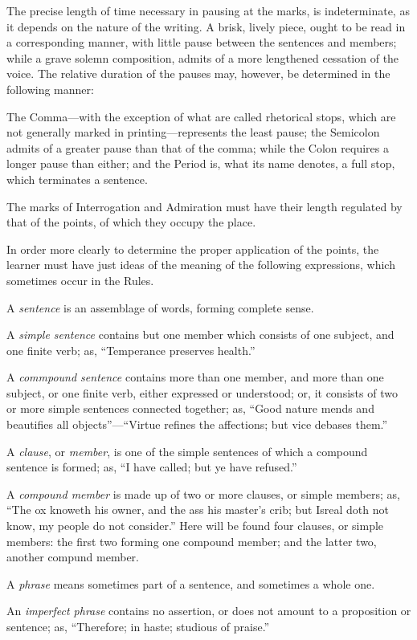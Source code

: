 \small
The precise length of time necessary in pausing at the marks, is indeterminate,
as it depends on the nature of the writing. A brisk, lively piece, ought to be
read in a corresponding manner, with little pause between the sentences and
members; while a grave solemn composition, admits of a more lengthened cessation
of the voice. The relative duration of the pauses may, however, be determined in
the following manner:

The Comma---with the exception of what are called rhetorical stops, which are
not generally marked in printing---represents the least pause; the Semicolon
admits of a greater pause than that of the comma; while the Colon requires a
longer pause than either; and the Period is, what its name denotes, a full stop,
which terminates a sentence.

The marks of Interrogation and Admiration must have their length regulated by
that of the points, of which they occupy the place.

In order more clearly to determine the proper application of the points, the
learner must have just ideas of the meaning of the following expressions, which
sometimes occur in the Rules.

A \emph{sentence} is an assemblage of words, forming complete sense.

A \emph{simple sentence} contains but one member which consists of one subject,
and one finite verb; as, ``Temperance preserves health.''

A \emph{commpound sentence} contains more than one member, and more than one
subject, or one finite verb, either expressed or understood; or, it consists of
two or more simple sentences connected together; as, ``Good nature mends and
beautifies all objects''---``Virtue refines the affections; but vice debases
them.''

A \emph{clause}, or \emph{member}, is one of the simple sentences of which a
compound sentence is formed; as, ``I have called; but ye have refused.''

A \emph{compound member} is made up of two or more clauses, or simple members;
as, ``The ox knoweth his owner, and the ass his master's crib; but Isreal doth
not know, my people do not consider.'' Here will be found four clauses, or
simple members: the first two forming one compound member; and the latter two,
another compund member.

A \emph{phrase} means sometimes part of a sentence, and sometimes a whole one.

An \emph{imperfect phrase} contains no assertion, or does not amount to a
proposition or sentence; as, ``Therefore; in haste; studious of praise.''


